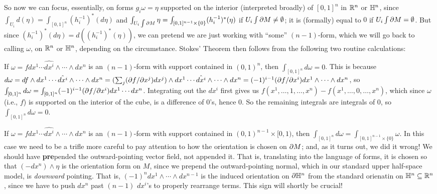 So now we can focus, essentially, on forms $g_i\omega =\eta$ supported on the interior 
(interpreted broadly) of $[0,1]^n$ in ${\Bbb R}^n$ or ${\Bbb H}^n$, since 
$\int_{U_i} d(\eta)= \int_{[0,1]^n} (h_i^{-1})^*(d\eta)$ and 
$\int_{U_i\int\partial M} \eta=\int_{[0,1]^{n-1}\times\{0\}} (h_i^{-1})^*(\eta)$
if $U_i\int\partial M\neq \emptyset$; it is (formally) equal to $0$ if $U_i\int\partial M=\emptyset$.
But since $(h_i^{-1})^*(d\eta)=d((h_i^{-1})^*(\eta))$, we can pretend we are just working with 
``some'' $(n-1)$-form, which we will go back to calling $\omega$, on ${\Bbb R}^n$ or ${\Bbb H}^n$, depending on the circumstance. 
Stokes' Theorem then follows from the following two routine calculations:

\msk

If $\omega = f dx^1\cdots \hat{dx^i}\wedge\cdots\wedge dx^n$ is an $(n-1)$-form with support 
contained in $(0,1)^n$, then $\int_{[0,1]^n} d\omega = 0$. This is because
$d\omega = df\wedge dx^1\cdots \hat{dx^i}\wedge\cdots\wedge dx^n=
(\sum_j(\partial f/\partial x^j)dx^j)\wedge dx^1\cdots \hat{dx^i}\wedge\cdots\wedge dx^n
=(-1)^{i-1}(\partial f/\partial x^i) dx^1\wedge\cdots \wedge dx^n$, so 
$\int_{[0,1]^n} d\omega = \int_{[0,1]^n} (-1)^{i-1}(\partial f/\partial x^i) dx^1\cdots dx^n$.
Integrating out the $dx^i$ first gives us $f(x^1,\ldots,1,\ldots,x^n)-f(x^1,\ldots,0,\ldots,x^n)$,
which since $\omega$ (i.e., $f$) is supported on the interior of the cube, is a difference of
$0$'s, hence $0$. So the remaining integrals are integrals of $0$, so 
$\int_{[0,1]^n} d\omega = 0$.

\ssk

If $\omega = f dx^1\cdots \hat{dx^i}\wedge\cdots\wedge dx^n$ is an $(n-1)$-form with support 
contained in $(0,1)^{n-1}\times [0,1)$, then $\int_{[0,1]^n} d\omega = \int_{[0,1]^{n-1}\times\{0\}}\omega$.
In this case we need to be a trifle more careful to pay attention to how the orientation is chosen
on $\partial M$; and, as it turns out, we did it wrong! We should have {\bf pre}pended the outward-pointing
vector field, not appended it. That is, translating into the language of forms, it is chosen so that
$(-dx^n)\wedge\eta$ is the orientation
form on $M$, since we prepend the outward-pointing normal, which in our standard upper half-space
model, is {\it downward} pointing. That is, $(-1)^{n}dx^1\wedge\cdots\wedge dx^{n-1}$ is the induced
orientation on $\partial{\Bbb H}^n$ from the standard orienatin on ${\Bbb H}^n\subseteq{\Bbb R}^n$, since we have to
push $dx^n$ past $(n-1)$ $dx^i$'s to properly rearrange terms. This sign will shortly be crucial!

